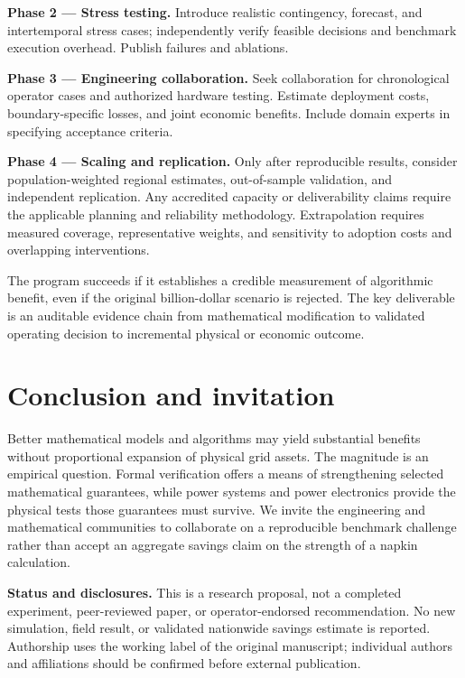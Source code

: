 \documentclass[11pt,letterpaper]{article}
\begin{document}
\textbf{Phase 2 --- Stress testing.} Introduce realistic contingency, forecast, and intertemporal stress cases; independently verify feasible decisions and benchmark execution overhead. Publish failures and ablations.

\textbf{Phase 3 --- Engineering collaboration.} Seek collaboration for chronological operator cases and authorized hardware testing. Estimate deployment costs, boundary-specific losses, and joint economic benefits. Include domain experts in specifying acceptance criteria.

\textbf{Phase 4 --- Scaling and replication.} Only after reproducible results, consider population-weighted regional estimates, out-of-sample validation, and independent replication. Any accredited capacity or deliverability claims require the applicable planning and reliability methodology. Extrapolation requires measured coverage, representative weights, and sensitivity to adoption costs and overlapping interventions.

The program succeeds if it establishes a credible measurement of algorithmic benefit, even if the original billion-dollar scenario is rejected. The key deliverable is an auditable evidence chain from mathematical modification to validated operating decision to incremental physical or economic outcome.

\section{Conclusion and invitation}
Better mathematical models and algorithms may yield substantial benefits without proportional expansion of physical grid assets. The magnitude is an empirical question. Formal verification offers a means of strengthening selected mathematical guarantees, while power systems and power electronics provide the physical tests those guarantees must survive. We invite the engineering and mathematical communities to collaborate on a reproducible benchmark challenge rather than accept an aggregate savings claim on the strength of a napkin calculation.

\textbf{Status and disclosures.} This is a research proposal, not a completed experiment, peer-reviewed paper, or operator-endorsed recommendation. No new simulation, field result, or validated nationwide savings estimate is reported. Authorship uses the working label of the original manuscript; individual authors and affiliations should be confirmed before external publication.
\end{document}
